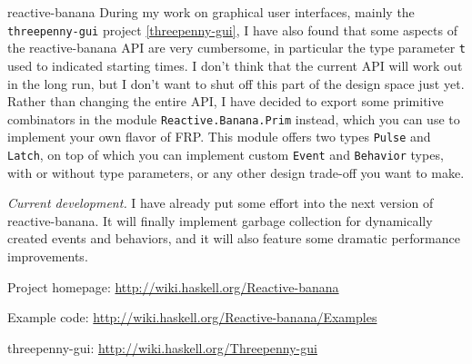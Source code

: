 \begin{hcarentry}[updated]{reactive-banana}
During my work on graphical user interfaces, mainly the \verb`threepenny-gui` project \cref{threepenny-gui}, I have also found that some aspects of the reactive-banana API are very cumbersome, in particular the type parameter \verb`t` used to indicated starting times. I don't think that the current API will work out in the long run, but I don't want to shut off this part of the design space just yet.
Rather than changing the entire API, I have decided to export some primitive combinators in the module \verb`Reactive.Banana.Prim` instead, which you can use to implement your own flavor of FRP. This module offers two types \verb`Pulse` and \verb`Latch`, on top of which you can implement custom \verb`Event` and \verb`Behavior` types, with or without type parameters, or any other design trade-off you want to make.

\emph{Current development.}
I have already put some effort into the next version of reactive-banana. It will finally implement garbage collection for dynamically created events and behaviors, and it will also feature some dramatic performance improvements.

\FurtherReading
\begin{compactitem}
\item Project homepage: \url{http://wiki.haskell.org/Reactive-banana}
\item Example code: \url{http://wiki.haskell.org/Reactive-banana/Examples}
\item threepenny-gui: \url{http://wiki.haskell.org/Threepenny-gui}
\end{compactitem}
\end{hcarentry}
